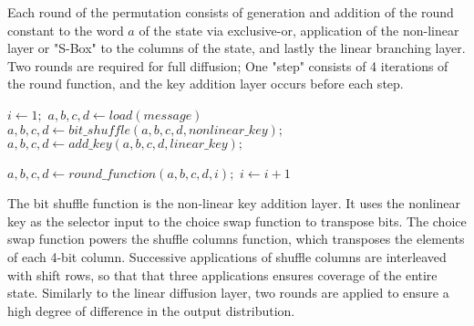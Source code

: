 \documentclass[preprint]{iacrtrans}
\begin{document}
Each round of the permutation consists of generation and addition of the round constant to the word $a$ of the state via exclusive-or, application of the non-linear layer or "S-Box" to the columns of the state, and lastly the linear branching layer. Two rounds are required for full diffusion; One "step" consists of 4 iterations of the round function, and the key addition layer occurs before each step. \\

\begin{algorithmic}
	\State $i \gets 1;$
	\State $a, b, c, d \gets load(message)$
		\State $a, b, c, d \gets bit\_shuffle(a, b, c, d, nonlinear\_key);$
		\State $a, b, c, d \gets add\_key(a, b, c, d, linear\_ key);$
	
			\State $a, b, c, d \gets round\_function(a, b, c, d, i);$	
			\State $i \gets i + 1$
		\EndFor
	\EndFor
\EndFunction\\
\end{algorithmic}

The bit shuffle function is the non-linear key addition layer. It uses the nonlinear key as the selector input to the choice swap function to transpose bits. The choice swap function powers the shuffle columns function, which transposes the elements of each 4-bit column. Successive applications of shuffle columns are interleaved with shift rows, so that that three applications ensures coverage of the entire state. Similarly to the linear diffusion layer, two rounds are applied to ensure a high degree of difference in the output distribution.\\
\end{document}
